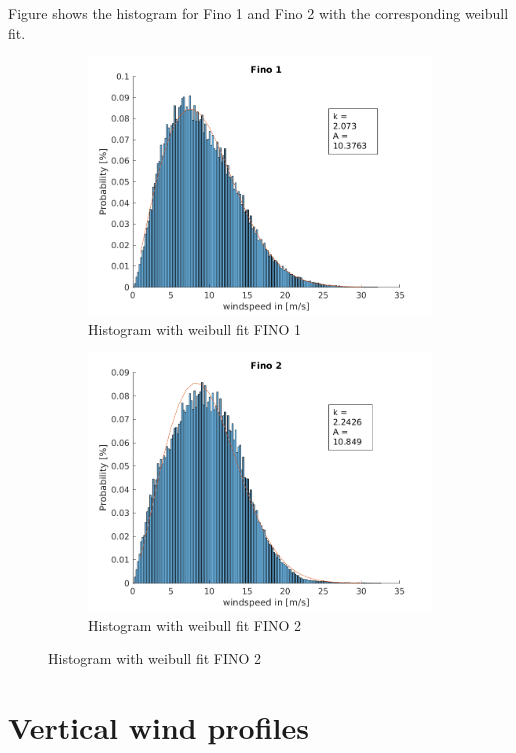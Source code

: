 \documentclass[10pt]{article}
\begin{document}
Figure shows the histogram for Fino 1 and Fino 2 with the corresponding weibull fit.
\begin{figure}[htb!]
\label{fig:WindRose1_valdidation}
\begin{subfigure}{0.5\textwidth}
  \centering
  \includegraphics[width=1\linewidth]{../figures/Hist_withfit_Fino1.png}
  \caption{Histogram with weibull fit FINO 1}
  \label{fig:Windrose_Fino1}
\end{subfigure}
\begin{subfigure}{0.5\textwidth}
  \centering
  \includegraphics[width=1\linewidth]{../figures/Hist_withfit_Fino2.png}
  \caption{Histogram with weibull fit FINO 2}
    \label{fig:Windrose_Fino2}
\end{subfigure}
\end{figure}
\section{Vertical wind profiles}
\end{document}
